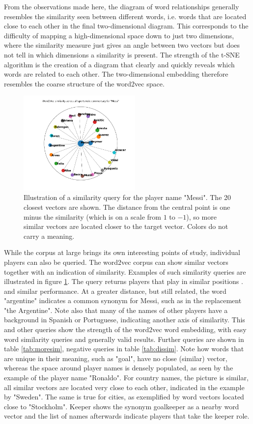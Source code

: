 \documentclass[10pt, a4paper]{UUThesisTemplate}
\begin{document}
From the observations made here, the diagram of word relationships generally resembles the similarity seen between different words, i.e. words that are located close to each other in the final two-dimensional diagram. This corresponds to the difficulty of mapping a high-dimensional space down to just two dimensions, where the similarity measure just gives an angle between two vectors but does not tell in which dimensions a similarity is present. The strength of the t-SNE algorithm is the creation of a diagram that clearly and quickly reveals which words are related to each other. The two-dimensional embedding therefore resembles the coarse structure of the word2vec space. 

\begin{figure}
\includegraphics[width=6cm]{figures/Messi_similarity.png}
\caption{Illustration of a similarity query for the player name "Messi". The 20 closest vectors are shown. The distance from the central point is one minus the similarity (which is on a scale from $1$ to $-1$), so more similar vectors are located closer to the target vector. Colors do not carry a meaning.}\label{fig:messisim}
\end{figure}

While the corpus at large brings its own interesting points of study, individual players can also be queried. The word2vec corpus can show similar vectors together with an indication of similarity. Examples of such similarity queries are illustrated in figure \ref{fig:messisim}. The query returns players that play in similar positions \cite{sumpter2}. and similar performance. At a greater distance, but still related, the word "argentine" indicates a common synonym for Messi, such as in the replacement "the Argentine". Note also that many of the names of other players have a background in Spanish or Portuguese, indicating another axis of similarity. This and other queries show the strength of the word2vec word embedding, with easy word similarity queries and generally valid results. Further queries are shown in table \ref{tab:moresim}, negative queries in table \ref{tab:dissim}. Note how words that are unique in their meaning, such as "goal", have no close (similar) vector, whereas the space around player names is densely populated, as seen by the example of the player name "Ronaldo". For country names, the picture is similar, all similar vectors are located very close to each other, indicated in the example by "Sweden". The same is true for cities, as exemplified by word vectors located close to "Stockholm". Keeper shows the synonym goalkeeper as a nearby word vector and the list of names afterwards indicate players that take the keeper role.
\end{document}
